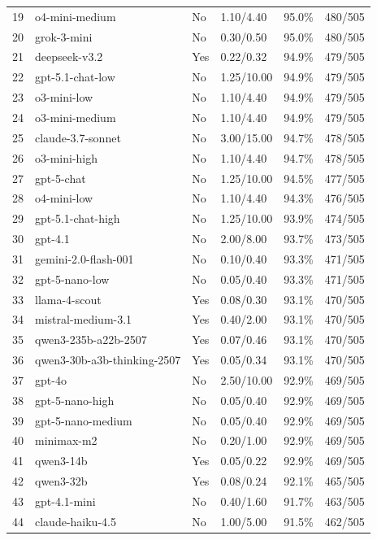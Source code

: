 \documentclass[11pt]{article}
\begin{document}
\begin{longtable}{rlllrr}
  19 & o4-mini-medium & No & 1.10/4.40 & 95.0\% & 480/505 \\
  20 & grok-3-mini & No & 0.30/0.50 & 95.0\% & 480/505 \\
  21 & deepseek-v3.2 & Yes & 0.22/0.32 & 94.9\% & 479/505 \\
  22 & gpt-5.1-chat-low & No & 1.25/10.00 & 94.9\% & 479/505 \\
  23 & o3-mini-low & No & 1.10/4.40 & 94.9\% & 479/505 \\
  24 & o3-mini-medium & No & 1.10/4.40 & 94.9\% & 479/505 \\
  25 & claude-3.7-sonnet & No & 3.00/15.00 & 94.7\% & 478/505 \\
  26 & o3-mini-high & No & 1.10/4.40 & 94.7\% & 478/505 \\
  27 & gpt-5-chat & No & 1.25/10.00 & 94.5\% & 477/505 \\
  28 & o4-mini-low & No & 1.10/4.40 & 94.3\% & 476/505 \\
  29 & gpt-5.1-chat-high & No & 1.25/10.00 & 93.9\% & 474/505 \\
  30 & gpt-4.1 & No & 2.00/8.00 & 93.7\% & 473/505 \\
  31 & gemini-2.0-flash-001 & No & 0.10/0.40 & 93.3\% & 471/505 \\
  32 & gpt-5-nano-low & No & 0.05/0.40 & 93.3\% & 471/505 \\
  33 & llama-4-scout & Yes & 0.08/0.30 & 93.1\% & 470/505 \\
  34 & mistral-medium-3.1 & Yes & 0.40/2.00 & 93.1\% & 470/505 \\
  35 & qwen3-235b-a22b-2507 & Yes & 0.07/0.46 & 93.1\% & 470/505 \\
  36 & qwen3-30b-a3b-thinking-2507 & Yes & 0.05/0.34 & 93.1\% & 470/505 \\
  37 & gpt-4o & No & 2.50/10.00 & 92.9\% & 469/505 \\
  38 & gpt-5-nano-high & No & 0.05/0.40 & 92.9\% & 469/505 \\
  39 & gpt-5-nano-medium & No & 0.05/0.40 & 92.9\% & 469/505 \\
  40 & minimax-m2 & No & 0.20/1.00 & 92.9\% & 469/505 \\
  41 & qwen3-14b & Yes & 0.05/0.22 & 92.9\% & 469/505 \\
  42 & qwen3-32b & Yes & 0.08/0.24 & 92.1\% & 465/505 \\
  43 & gpt-4.1-mini & No & 0.40/1.60 & 91.7\% & 463/505 \\
  44 & claude-haiku-4.5 & No & 1.00/5.00 & 91.5\% & 462/505 \\

\end{longtable}
\end{document}
